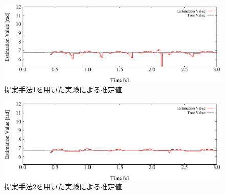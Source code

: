 \documentclass[a4paper,12pt]{jarticle}
\begin{document}
\begin{figure}[htbp]
 \centering
 \includegraphics[scale=0.7]{check50mod1.eps}
    \caption{提案手法1を用いた実験による推定値}
		\label{check50mod1}
\end{figure}\begin{figure}[htbp]
 \centering
 \includegraphics[scale=0.7]{check50mod2.eps}
		\caption{提案手法2を用いた実験による推定値}
		\label{check50mod2}
\end{figure}
\end{document}
